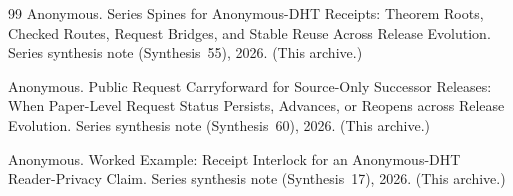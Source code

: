 \documentclass[11pt]{article}
\begin{document}
\begin{thebibliography}{99}
Anonymous.
\newblock Series Spines for Anonymous-DHT Receipts: Theorem Roots, Checked Routes, Request Bridges, and Stable Reuse Across Release Evolution.
\newblock Series synthesis note (Synthesis~55), 2026. (This archive.)

Anonymous.
\newblock Public Request Carryforward for Source-Only Successor Releases: When Paper-Level Request Status Persists, Advances, or Reopens across Release Evolution.
\newblock Series synthesis note (Synthesis~60), 2026. (This archive.)

Anonymous.
\newblock Worked Example: Receipt Interlock for an Anonymous-DHT Reader-Privacy Claim.
\newblock Series synthesis note (Synthesis~17), 2026. (This archive.)

\end{thebibliography}
\end{document}
